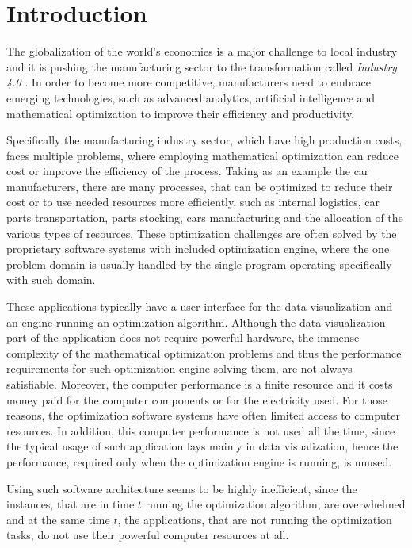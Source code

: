 \chapter{Introduction}\label{ch:introduction}
The globalization of the world’s economies is a major challenge to local industry 
and it is pushing the manufacturing sector to the transformation called \textit{Industry 4.0} \cite{industry40}.
In order to become more competitive, 
manufacturers need to embrace emerging technologies, 
such as advanced analytics, artificial intelligence 
and mathematical optimization to improve their efficiency and productivity.

Specifically the manufacturing industry sector,
which have high production costs,
faces multiple problems,
where employing mathematical optimization can reduce cost or improve the efficiency of the process.
Taking as an example the car manufacturers,
there are many processes,
that can be optimized to reduce their cost or to use needed resources more efficiently,
such as internal logistics, car parts transportation, parts stocking, cars manufacturing 
and the allocation of the various types of resources.
These optimization challenges are often solved by the proprietary software systems with included optimization engine,
where the one problem domain is usually handled by the single program operating specifically with such domain.

These applications typically have a user interface for the data visualization
and an engine running an optimization algorithm.
Although the data visualization part of the application does not require powerful hardware,
the immense complexity of the mathematical optimization problems 
and thus the performance requirements for such optimization engine solving them, are not always satisfiable.
Moreover,
the computer performance is a finite resource
and it costs money paid for the computer components or for the electricity used.
For those reasons,
the optimization software systems have often limited access to computer resources.
In addition,
this computer performance is not used all the time,
since the typical usage of such application lays mainly in data visualization,
hence the performance, required only when the optimization engine is running, is unused.

Using such software architecture seems to be highly inefficient,
since the instances, that are in time $t$ running the optimization algorithm, are overwhelmed 
and at the same time $t$,
the applications, that are not running the optimization tasks,
do not use their powerful computer resources at all.

